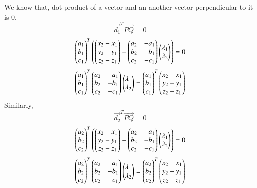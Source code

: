 \documentclass[journal,12pt,twocolumn]{IEEEtran}
\begin{document}
We know that, dot product of a vector and an another vector perpendicular to it is $0$.
\begin{equation}
    \vec{d_1}^T\vec{PQ} = 0
\end{equation}
\begin{equation}
    \begin{pmatrix}a_1\\b_1\\c_1\end{pmatrix}^T\left(\begin{pmatrix}x_2 - x_1\\y_2 - y_1\\z_2 - z_1\end{pmatrix} - \begin{pmatrix}a_2 & -a_1\\b_2 & -b_1\\c_2 & -c_1\end{pmatrix}\begin{pmatrix}\lambda{_1} \\\lambda{_2}\end{pmatrix}\right) = 0
\end{equation}
\begin{equation}\label{eq1}
    \begin{pmatrix}a_1\\b_1\\c_1\end{pmatrix}^T\begin{pmatrix}a_2 & -a_1\\b_2 & -b_1\\c_2 & -c_1\end{pmatrix}\begin{pmatrix}\lambda{_1}\\\lambda{_2}\end{pmatrix} = \begin{pmatrix}a_1\\b_1\\c_1\end{pmatrix}^T\begin{pmatrix}x_2 - x_1\\y_2 - y_1\\z_2 - z_1\end{pmatrix}
\end{equation}
Similarly,\\
\begin{equation}
    \vec{d_2}^T\vec{PQ} = 0
\end{equation}
\begin{equation}
    \begin{pmatrix}a_2\\b_2\\c_2\end{pmatrix}^T\left(\begin{pmatrix}x_2 - x_1\\y_2 - y_1\\z_2 - z_1\end{pmatrix} - \begin{pmatrix}a_2 & -a_1\\b_2 & -b_1\\c_2 & -c_1\end{pmatrix}\begin{pmatrix}\lambda{_1} \\\lambda{_2}\end{pmatrix}\right) = 0
\end{equation}
\begin{equation}\label{eq2}
    \begin{pmatrix}a_2\\b_2\\c_2\end{pmatrix}^T\begin{pmatrix}a_2 & -a_1\\b_2 & -b_1\\c_2 & -c_1\end{pmatrix}\begin{pmatrix}\lambda{_1}\\\lambda{_2}\end{pmatrix} = \begin{pmatrix}a_2\\b_2\\c_2\end{pmatrix}^T\begin{pmatrix}x_2 - x_1\\y_2 - y_1\\z_2 - z_1\end{pmatrix}
\end{equation}
\end{document}
